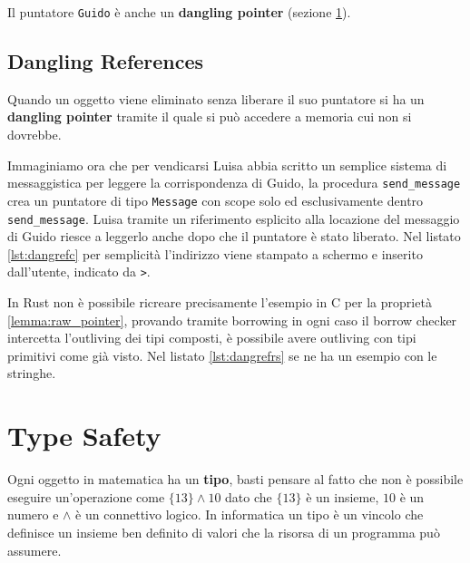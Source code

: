 \documentclass[Lau,binding=0.6cm]{sapthesis}
\newcommand{\textcode}[1]{\colorbox{backcolour}{\texttt{#1}}}
\begin{document}



Il puntatore \textcode{Guido} è anche un \textbf{dangling pointer} (sezione \ref{sec:dangling_reference}).

\section{Dangling References} \label{sec:dangling_reference}
Quando un oggetto viene eliminato senza liberare il suo puntatore si ha un \textbf{dangling pointer} tramite il quale si può accedere a memoria cui non si dovrebbe.

Immaginiamo ora che per vendicarsi Luisa abbia scritto un semplice sistema di messaggistica per leggere la corrispondenza di Guido, la procedura \textcode{send\_message} crea un puntatore di tipo \textcode{Message} con scope solo ed esclusivamente dentro \textcode{send\_message}. 
Luisa tramite un riferimento esplicito alla locazione del messaggio di Guido riesce a leggerlo anche dopo che il puntatore è stato liberato.
Nel listato \ref{lst:dangrefc} per semplicità l'indirizzo viene stampato a schermo e inserito dall'utente, indicato da \textcode{>}.




In Rust non è possibile ricreare precisamente l'esempio in C per la proprietà \ref{lemma:raw_pointer}, provando tramite borrowing in ogni caso il borrow checker intercetta l'outliving dei tipi composti, è possibile avere outliving con tipi primitivi come già visto. 
Nel listato \ref{lst:dangrefrs} se ne ha un esempio con le stringhe.



\chapter{Type Safety} \label{chap:type_safety}
Ogni oggetto in matematica ha un \textbf{tipo}, basti pensare al fatto che non è possibile eseguire un'operazione come $ \{13\} \land 10 $ dato che $\{13\}$ è un insieme, $10$ è un numero e $\land$ è un connettivo logico. 
In informatica un tipo è un vincolo che definisce un insieme ben definito di valori che la risorsa di un programma può assumere.
\end{document}
